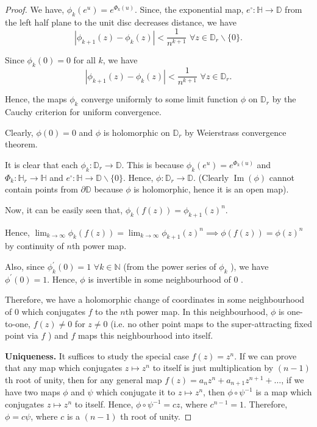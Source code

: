\begin{proof}
We have, $\phi_{k}\left(e^{u}\right)=e^{\Phi_{k}(u)}$. Since, the exponential map, $e^{\square}: \mathbb{H} \rightarrow \mathbb{D}$ from the left half plane to the unit disc decreases distance, we have
$$
\left|\phi_{k+1}(z)-\phi_{k}(z)\right|<\frac{1}{n^{k+1}}\,\, \forall z \in \mathbb{D}_{r} \backslash\{0\} .
$$

Since $\phi_{k}(0)=0$ for all $k$, we have
$$
\left|\phi_{k+1}(z)-\phi_{k}(z)\right|<\frac{1}{n^{k+1}}\,\, \forall z \in \mathbb{D}_{r}.
$$

Hence, the maps $\phi_{k}$ converge uniformly to some limit function $\phi$ on $\mathbb{D}_{r}$ by the Cauchy criterion for uniform convergence.

Clearly, $\phi(0)=0$ and $\phi$ is holomorphic on $\mathbb{D}_{r}$ by Weierstrass convergence theorem.

It is clear that each $\phi_{k}: \mathbb{D}_{r} \rightarrow \mathbb{D}$. This is because $\phi_{k}\left(e^{u}\right)=e^{\Phi_{k}(u)}$ and $\Phi_{k}: \mathbb{H}_{r} \rightarrow \mathbb{H}$ and $e^{\square}: \mathbb{H} \rightarrow \mathbb{D} \backslash\{0\}$. Hence, $\phi: \mathbb{D}_{r} \rightarrow \mathbb{D}$. (Clearly $\operatorname{Im}(\phi)$ cannot contain points from $\partial \mathbb{D}$ because $\phi$ is holomorphic, hence it is an open map).

Now, it can be easily seen that, $\phi_{k}(f(z))=\phi_{k+1}(z)^{n}$.

Hence, $\lim _{k \rightarrow \infty} \phi_{k}(f(z))=\lim _{k \rightarrow \infty} \phi_{k+1}(z)^{n} \implies \phi(f(z))=\phi(z)^{n}$ by continuity of $n$th power map.

Also, since $\phi_{k}^{\prime}(0)=1$ $\forall k \in \mathbb{N}$ (from the power series of $\phi_{k}$ ), we have $\phi^{\prime}(0)=1$. Hence, $\phi$ is invertible in some neighbourhood of 0 .

Therefore, we have a holomorphic change of coordinates in some neighbourhood of 0 which conjugates $f$ to the $n$th power map. In this neighbourhood, $\phi$ is one-to-one, $f(z) \neq 0$ for $z \neq 0$ (i.e. no other point maps to the super-attracting fixed point via $f$ ) and $f$ maps this neighbourhood into itself.\\
\vspace{1pt}

\noindent \textbf{Uniqueness.} It suffices to study the special case $f(z)=z^{n}$. If we can prove that any map which conjugates $z \mapsto z^{n}$ to itself is just multiplication by $(n-1)$ th root of unity, then for any general map $f(z)=a_{n} z^{n}+a_{n+1} z^{n+1}+\ldots$, if we have two maps $\phi$ and $\psi$ which conjugate it to $z \mapsto z^{n}$, then $\phi \circ \psi^{-1}$ is a map which conjugates $z \mapsto z^{n}$ to itself. Hence, $\phi \circ \psi^{-1}=c z$, where $c^{n-1}=1$. Therefore, $\phi=c \psi$, where $c$ is a $(n-1)$ th root of unity.


\end{proof}
